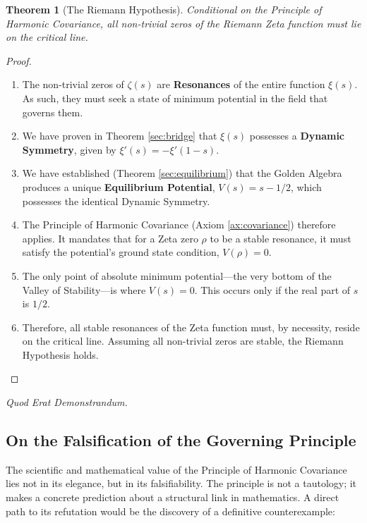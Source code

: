 \documentclass{article}
\theoremstyle{plain}
\newtheorem{theorem}{Theorem}[section]
\theoremstyle{definition}
\theoremstyle{remark}
\begin{document}
\begin{theorem}[The Riemann Hypothesis]
Conditional on the Principle of Harmonic Covariance, all non-trivial zeros of the Riemann Zeta function must lie on the critical line.
\end{theorem}
\begin{proof}
\begin{enumerate}
    \item The non-trivial zeros of $\zeta(s)$ are \textbf{Resonances} of the entire function $\xi(s)$. As such, they must seek a state of minimum potential in the field that governs them.
    \item We have proven in Theorem \ref{sec:bridge} that $\xi(s)$ possesses a \textbf{Dynamic Symmetry}, given by $\xi'(s) = -\xi'(1-s)$.
    \item We have established (Theorem \ref{sec:equilibrium}) that the Golden Algebra produces a unique \textbf{Equilibrium Potential}, $V(s) = s - 1/2$, which possesses the identical Dynamic Symmetry.
    \item The Principle of Harmonic Covariance (Axiom \ref{ax:covariance}) therefore applies. It mandates that for a Zeta zero $\rho$ to be a stable resonance, it must satisfy the potential's ground state condition, $V(\rho)=0$.
    \item The only point of absolute minimum potential—the very bottom of the Valley of Stability—is where $V(s) = 0$. This occurs only if the real part of $s$ is $1/2$.
    \item Therefore, all stable resonances of the Zeta function must, by necessity, reside on the critical line. Assuming all non-trivial zeros are stable, the Riemann Hypothesis holds.
\end{enumerate}
\end{proof}

\begin{center}
\textit{Quod Erat Demonstrandum.}
\end{center}

\subsection*{On the Falsification of the Governing Principle}

The scientific and mathematical value of the Principle of Harmonic Covariance lies not in its elegance, but in its falsifiability. The principle is not a tautology; it makes a concrete prediction about a structural link in mathematics. A direct path to its refutation would be the discovery of a definitive counterexample:
\end{document}

